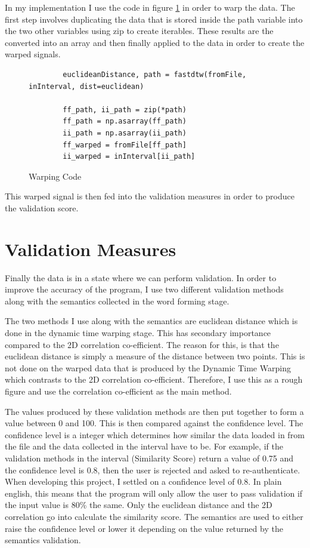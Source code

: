 \documentclass[10pt,a4paper]{report}
\begin{document}
In my implementation I use the code in figure \ref{fig:warping} in order to warp the data. The first step involves duplicating the data that is stored inside the path variable into the two other variables using zip to create iterables. These results are the converted into an array and then finally applied to the data in order to create the warped signals.

\begin{figure}
	\begin{lstlisting}
		euclideanDistance, path = fastdtw(fromFile, inInterval, dist=euclidean)
                    
        ff_path, ii_path = zip(*path)
        ff_path = np.asarray(ff_path)
        ii_path = np.asarray(ii_path)
        ff_warped = fromFile[ff_path]
        ii_warped = inInterval[ii_path]
	\end{lstlisting}
	\caption{Warping Code}
	\label{fig:warping}
\end{figure}

This warped signal is then fed into the validation measures in order to produce the validation score. 

\section{Validation Measures}

Finally the data is in a state where we can perform validation. In order to improve the accuracy of the program, I use two different validation methods along with the semantics collected in the word forming stage. 

The two methods I use along with the semantics are euclidean distance which is done in the dynamic time warping stage. This has secondary importance compared to the 2D correlation co-efficient. The reason for this, is that the euclidean distance is simply a measure of the distance between two points. This is not done on the warped data that is produced by the Dynamic Time Warping which contrasts to the 2D correlation co-efficient. Therefore, I use this as a rough figure and use the correlation co-efficient as the main method. 

The values produced by these validation methods are then put together to form a value between 0 and 100. This is then compared against the confidence level. The confidence level is a integer which determines how similar the data loaded in from the file and the data collected in the interval have to be. For example, if the validation methods in the interval (Similarity Score) return a value of 0.75 and the confidence level is 0.8, then the user is rejected and asked to re-authenticate. When developing this project, I settled on a confidence level of 0.8. In plain english, this means that the program will only allow the user to pass validation if the input value is 80\% the same. Only the euclidean distance and the 2D correlation go into calculate the similarity score. The semantics are used to either raise the confidence level or lower it depending on the value returned by the semantics validation.
\end{document}
